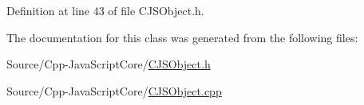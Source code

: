 Definition at line 43 of file C\+J\+S\+Object.\+h.



The documentation for this class was generated from the following files\+:\begin{DoxyCompactItemize}
\item 
Source/\+Cpp-\/\+Java\+Script\+Core/\mbox{\hyperlink{_c_j_s_object_8h}{C\+J\+S\+Object.\+h}}\item 
Source/\+Cpp-\/\+Java\+Script\+Core/\mbox{\hyperlink{_c_j_s_object_8cpp}{C\+J\+S\+Object.\+cpp}}\end{DoxyCompactItemize}

